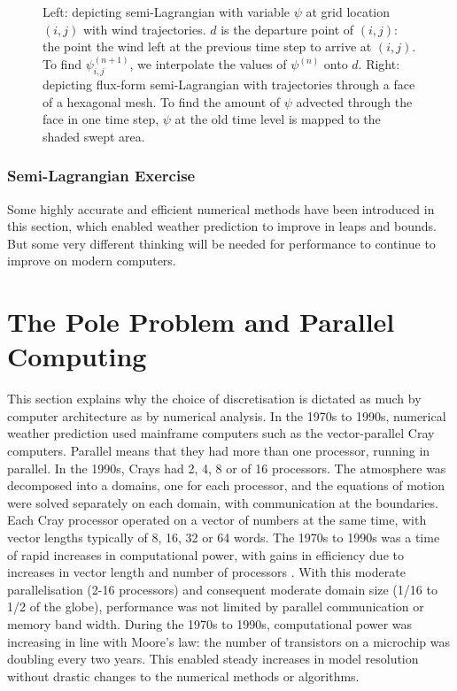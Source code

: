 \begin{figure}
\resizebox{0.48\textwidth}{!}{}
\resizebox{0.48\textwidth}{!}{}

\caption{Left: depicting semi-Lagrangian with variable $\psi$ at grid location
$\left(i,j\right)$ with wind trajectories. $d$ is the departure
point of $\left(i,j\right)$: the point the wind left at the previous
time step to arrive at $\left(i,j\right)$. To find $\psi_{i,j}^{(n+1)}$,
we interpolate the values of $\psi^{(n)}$ onto $d$. Right: depicting
flux-form semi-Lagrangian with trajectories through a face of a hexagonal
mesh. To find the amount of $\psi$ advected through the face in one
time step, $\psi$ at the old time level is mapped to the shaded swept
area. }\label{fig:semiLagrangian}
\end{figure}


\subsubsection{Semi-Lagrangian Exercise}\label{subsec:ExSL}


Some highly accurate and efficient numerical methods have been introduced
in this section, which enabled weather prediction to improve in leaps
and bounds. But some very different thinking will be needed for performance
to continue to improve on modern computers.

\section{The Pole Problem and Parallel Computing}

This section explains why the choice of discretisation is dictated
as much by computer architecture as by numerical analysis. In the
1970s to 1990s, numerical weather prediction used mainframe computers
such as the vector-parallel Cray computers. Parallel means that they
had more than one processor, running in parallel. In the 1990s, Crays
had 2, 4, 8 or of 16 processors. The atmosphere was decomposed into
a domains, one for each processor, and the equations of motion were
solved separately on each domain, with communication at the boundaries.
Each Cray processor operated on a vector of numbers at the same time,
with vector lengths typically of 8, 16, 32 or 64 words. The 1970s
to 1990s was a time of rapid increases in computational power, with
gains in efficiency due to increases in vector length and number of
processors \citep[eg.][]{BDI+95}. With this moderate parallelisation
(2-16 processors) and consequent moderate domain size (1/16 to 1/2
of the globe), performance was not limited by parallel communication
or memory band width. During the 1970s to 1990s, computational power
was increasing in line with Moore's law: the number of transistors
on a microchip was doubling every two years. This enabled steady increases
in model resolution without drastic changes to the numerical methods
or algorithms.

